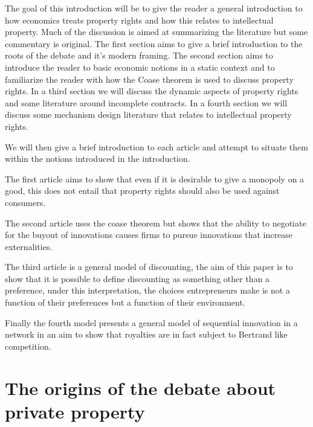 \documentclass[12pt]{article}
\numberwithin{equation}{section}
\begin{document}
The goal of this introduction will be to give the reader a general introduction to how economics treats property rights and how this relates to intellectual property. Much of the discussion is aimed at summarizing the literature but some commentary is original. The first section aims to give a brief introduction to the roots of the debate and it's modern framing. The second section aims to introduce the reader to basic economic notions in a static context and to familiarize the reader with how the Coase theorem is used to discuss property rights. In a third section we will discuss the dynamic aspects of property rights and some literature around incomplete contracts. In a fourth section we will discuss some mechanism design literature that relates to intellectual property rights. 

We will then give a brief introduction to each article and attempt to situate them within the notions introduced in the introduction. 

The first article aims to show that even if it is desirable to give a monopoly on a good, this does not entail that property rights should also be used against consumers. 

The second article uses the coase theorem but shows that the ability to negotiate for the buyout of innovations causes firms to pursue innovations that increase externalities. 

The third article is a general model of discounting, the aim of this paper is to show that it is possible to define discounting as something other than a preference, under this interpretation, the choices entrepreneurs make is not a function of their preferences but a function of their environment. 

Finally the fourth model presents a general model of sequential innovation in a network in an aim to show that royalties are in fact subject to Bertrand like competition.

\section{The origins of the debate about private property}
\end{document}
